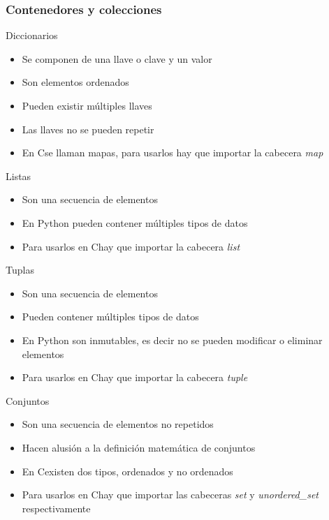 \documentclass{beamer}
\newcommand{\Rplus}{\protect\hspace{-.1em}\protect\raisebox{.35ex}{\smaller{\smaller\textbf{+}}}}
\newcommand{\Cpp}{\mbox{C\Rplus\Rplus}\hspace{3pt}}
\begin{document}
\subsubsection{Contenedores y colecciones}

\begin{frame}{Diccionarios}
    \begin{itemize}
        \item Se componen de una llave o clave y un valor
        \item Son elementos ordenados
        \item Pueden existir m\'ultiples llaves
        \item Las llaves no se pueden repetir
        \item En \Cpp se llaman mapas, para usarlos hay que importar la cabecera \textit{map}
    \end{itemize}
\end{frame}

\begin{frame}{Listas}
    \begin{itemize}
        \item Son una secuencia de elementos
        \item En Python pueden contener m\'ultiples tipos de datos
        \item Para usarlos en \Cpp hay que importar la cabecera \textit{list}
    \end{itemize}
\end{frame}

\begin{frame}{Tuplas}
    \begin{itemize}
        \item Son una secuencia de elementos
        \item Pueden contener m\'ultiples tipos de datos
        \item En Python son inmutables, es decir no se pueden modificar o eliminar elementos
        \item Para usarlos en \Cpp hay que importar la cabecera \textit{tuple}
    \end{itemize}
\end{frame}

\begin{frame}{Conjuntos}
    \begin{itemize}
        \item Son una secuencia de elementos no repetidos
        \item Hacen alusi\'on a la definici\'on matem\'atica de conjuntos
        \item En \Cpp existen dos tipos, ordenados y no ordenados
        \item Para usarlos en \Cpp hay que importar las cabeceras \textit{set} y \textit{unordered\_set} respectivamente\nocite{BHASIN,BJARNE1,BJARNE2,CAIRO,CPP,DEITEL,DOWNEY,JAWORSKI,KENN,lAAKMANN,MATTHES,RAMALHO,SED,BRASSARD}
    \end{itemize}
\textbf{}\end{frame}
\end{document}
